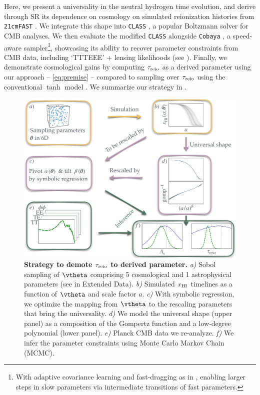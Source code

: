 Here, we present a universality in the neutral hydrogen time evolution,
and derive through SR its dependence on cosmology on simulated
reionization histories from \texttt{21cmFAST} \cite{MesingerEtAl2011,
Murray2020}.
We integrate this shape into \texttt{CLASS} \cite{Blas2011}, a popular
Boltzmann solver for CMB analyses.
We then evaluate the modified \texttt{CLASS} alongside \texttt{Cobaya}
\cite{Torrado2020}, a speed-aware sampler\cite{Lewis2002,
Lewis2013}\footnote{With adaptive covariance learning and fast-dragging
as in \cite{Neal2005}, enabling larger steps in slow parameters via
intermediate transitions of fast parameters.}, showcasing its ability to
recover parameter constraints from CMB data, including `TTTEEE' +
lensing likelihoods \cite{Planck2020c, Planck2020d} (see ).
Finally, we demonstrate cosmological gains by computing $\tau_{\mathrm{reio}}$ as
a derived parameter using our approach -- \cref{eq:premise} --
compared to sampling over $\tau_{\mathrm{reio}}$ using the conventional $\tanh$
model \cite{Lewis2008}.
We summarize our strategy in .

\begin{figure}[tb]
\centering
\includegraphics[width=\linewidth]{figs/big_fig.pdf}
\caption{\textbf{Strategy to demote $\tau_{\mathrm{reio}}$ to derived parameter.}
\emph{a)} Sobol sampling of $\vtheta$ comprising 5 cosmological and 1
astrophysical parameters (see  in Extended Data).
\emph{b)} Simulated $x_{\mathrm{HI}}$ timelines as a function of $\vtheta$ and
scale factor $a$.
\emph{c)} With symbolic regression, we optimize the mapping from
$\vtheta$ to the rescaling parameters that bring the universality.
\emph{d)} We model the universal shape (upper panel) as a composition of
the Gompertz function and a low-degree polynomial (lower panel).
\emph{e)} Planck CMB data we re-analyze.
\emph{f)} We infer the parameter constraints using Monte Carlo Markov
Chain (MCMC).}
\label{fig:big}
\end{figure}

